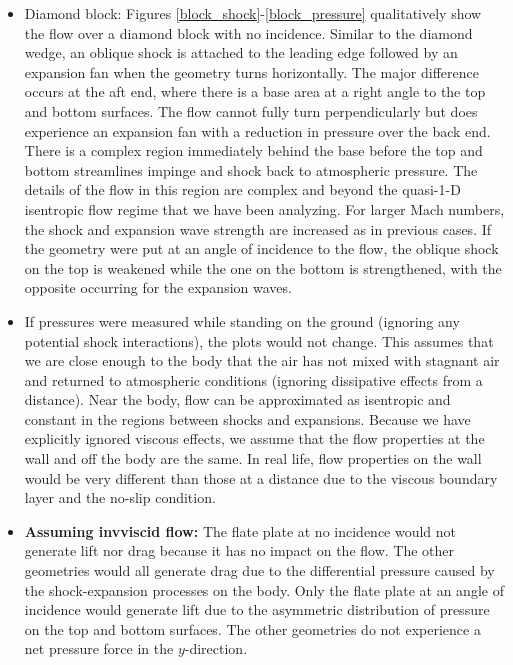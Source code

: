 \documentclass[../main.tex]{subfiles}
\begin{document}
\begin{itemize}
    \item Diamond block: Figures \ref{block_shock}-\ref{block_pressure} qualitatively show the flow over a diamond block with no incidence.
    Similar to the diamond wedge, an oblique shock is attached to the leading edge followed by an expansion fan when the geometry turns horizontally.
    The major difference occurs at the aft end, where there is a base area at a right angle to the top and bottom surfaces.
    The flow cannot fully turn perpendicularly but does experience an expansion fan with a reduction in pressure over the back end.
    There is a complex region immediately behind the base before the top and bottom streamlines impinge and shock back to atmospheric pressure.
    The details of the flow in this region are complex and beyond the quasi-1-D isentropic flow regime that we have been analyzing.
    For larger Mach numbers, the shock and expansion wave strength are increased as in previous cases.
    If the geometry were put at an angle of incidence to the flow, the oblique shock on the top is weakened while the one on the bottom is strengthened, with the opposite occurring for the expansion waves.

    \item If pressures were measured while standing on the ground (ignoring any potential shock interactions), the plots would not change.
    This assumes that we are close enough to the body that the air has not mixed with stagnant air and returned to atmospheric conditions (ignoring dissipative effects from a distance).
    Near the body, flow can be approximated as isentropic and constant in the regions between shocks and expansions.
    Because we have explicitly ignored viscous effects, we assume that the flow properties at the wall and off the body are the same.
    In real life, flow properties on the wall would be very different than those at a distance due to the viscous boundary layer and the no-slip condition. 

    \item \textbf{Assuming invviscid flow:} The flate plate at no incidence would not generate lift nor drag because it has no impact on the flow.
    The other geometries would all generate drag due to the differential pressure caused by the shock-expansion processes on the body.
    Only the flate plate at an angle of incidence would generate lift due to the asymmetric distribution of pressure on the top and bottom surfaces.
    The other geometries do not experience a net pressure force in the \(y\)-direction. 

\end{itemize}
\end{document}
